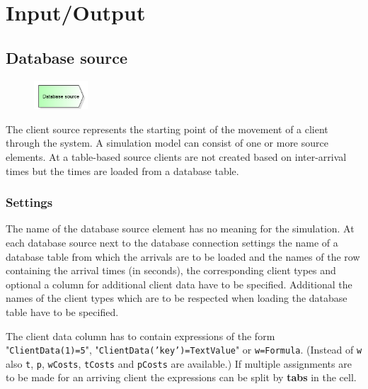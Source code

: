 \chapter{Input/Output}

\renewcommand{\thepage}{\arabic{page}}
\setcounter{page}{1}

\section{Database source}
\label{ref:ModelElementSourceDB}

\begin{figure}
\vspace{-22pt}
\includegraphics[width=2cm]{imageModelElementSourceDB.png}
\vspace{-22pt}
\end{figure}

The client source represents the starting point of the movement of a client through the system.
A simulation model can consist of one or more source elements.
At a table-based source clients are not created based on inter-arrival times but the
times are loaded from a database table.

\subsection*{Settings}

The name of the database source element has no meaning for the simulation.
At each database source next to the database connection settings the
name of a database table from which the arrivals are to be loaded and
the names of the row containing the arrival times (in seconds), the
corresponding client types and optional a column for additional client
data have to be specified. Additional the names of the client types
which are to be respected when loading the database table have to
be specified.

The client data column has to contain expressions of the form 
"\texttt{ClientData(1)=5}", "\texttt{ClientData('key')=TextValue}"
or \texttt{w=Formula}. (Instead of \texttt{w} also \texttt{t}, \texttt{p},
\texttt{wCosts}, \texttt{tCosts} and \texttt{pCosts} are available.)
If multiple assignments are to be made for an arriving client
the expressions can be split by \textbf{tabs} in the cell.

